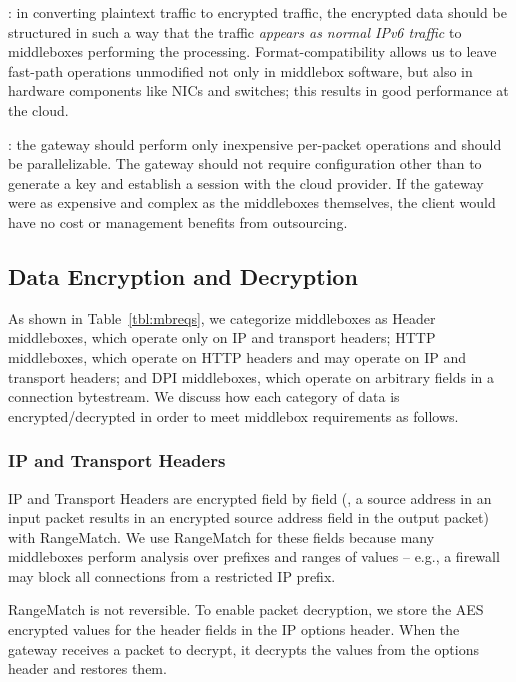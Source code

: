 : in converting plaintext traffic to encrypted traffic, the encrypted data should be structured in such a way that the traffic {\it appears as normal IPv6 traffic} to middleboxes performing the processing. Format-compatibility allows us to leave fast-path operations unmodified not only in middlebox software, but also in hardware components like NICs and switches; this results in good performance at the cloud.

: the gateway should perform only inexpensive per-packet operations and should be parallelizable. The gateway should not require configuration other than to generate a key and establish a session with the cloud provider. If the gateway were as expensive and complex as the middleboxes themselves, the client would have no cost or management benefits from outsourcing. 


\subsection{Data Encryption and Decryption}
\label{sec:dataenc}

As shown in Table~\ref{tbl:mbreqs}, we categorize middleboxes as Header middleboxes, which operate only on IP and transport headers; HTTP middleboxes, which operate on HTTP headers and may operate on IP and transport headers; and DPI middleboxes, which operate on arbitrary fields in a connection bytestream. 
We discuss how each category of data is encrypted/decrypted in order to meet middlebox requirements as follows.

\subsubsection{IP and Transport Headers}
IP and Transport Headers are encrypted field by field (\eg{}, a source address in an input packet results in an encrypted source address field in the output packet) with RangeMatch.
We use RangeMatch for these fields because many middleboxes perform analysis over prefixes and ranges of values -- e.g., a firewall may block all connections from a restricted IP prefix.

 RangeMatch is not reversible. To enable packet decryption, we store the AES encrypted values for the header fields in the IP options header. When the gateway receives a packet to decrypt, it decrypts the values from the options header and restores them.%

